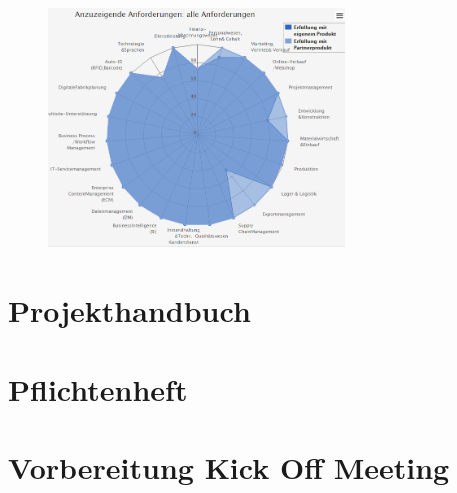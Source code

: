 \documentclass[12pt]{article}
\begin{document}
\begin{figure}[here!]
\centering
\includegraphics[width=0.7\textwidth]{images/matching4}
\end{figure}\FloatBarrier
\noindent


\section*{Projekthandbuch}
\section*{Pflichtenheft}
\section*{Vorbereitung Kick Off Meeting}




\newpage
\listoftables
\listoffigures
\end{document}
